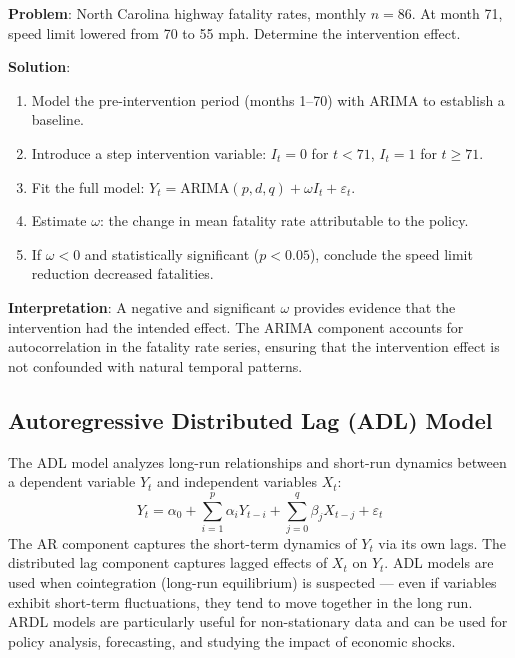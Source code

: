 \documentclass[11pt,a4paper]{article}
\begin{document}
\begin{tcolorbox}[colback=blue!5!white,colframe=blue!75!black,title=\textbf{Worked Example 14: Intervention Analysis -- Speed Limit}]
\textbf{Problem}: North Carolina highway fatality rates, monthly $n=86$. At month 71, speed limit lowered from 70 to 55 mph. Determine the intervention effect.

\textbf{Solution}:
\begin{enumerate}
    \item Model the pre-intervention period (months 1--70) with ARIMA to establish a baseline.
    \item Introduce a step intervention variable: $I_t = 0$ for $t < 71$, $I_t = 1$ for $t \geq 71$.
    \item Fit the full model: $Y_t = \text{ARIMA}(p,d,q) + \omega I_t + \varepsilon_t$.
    \item Estimate $\omega$: the change in mean fatality rate attributable to the policy.
    \item If $\omega < 0$ and statistically significant ($p < 0.05$), conclude the speed limit reduction decreased fatalities.
\end{enumerate}
\textbf{Interpretation}: A negative and significant $\omega$ provides evidence that the intervention had the intended effect. The ARIMA component accounts for autocorrelation in the fatality rate series, ensuring that the intervention effect is not confounded with natural temporal patterns.
\end{tcolorbox}

\subsection{Autoregressive Distributed Lag (ADL) Model}

The ADL model analyzes long-run relationships and short-run dynamics between a dependent variable $Y_t$ and independent variables $X_t$:
\[
Y_t = \alpha_0 + \sum_{i=1}^p \alpha_i Y_{t-i} + \sum_{j=0}^q \beta_j X_{t-j} + \varepsilon_t
\]
The AR component captures the short-term dynamics of $Y_t$ via its own lags. The distributed lag component captures lagged effects of $X_t$ on $Y_t$. ADL models are used when cointegration (long-run equilibrium) is suspected --- even if variables exhibit short-term fluctuations, they tend to move together in the long run. ARDL models are particularly useful for non-stationary data and can be used for policy analysis, forecasting, and studying the impact of economic shocks.
\end{document}
